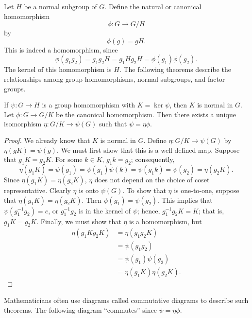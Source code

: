 Let $H$ be a normal subgroup of $G$. Define the {\bfi
natural\/} or {\bfi canonical
homomorphism}  
\[
\phi : G \rightarrow G/H
\]
by
\[
\phi(g) = gH.
\]
This is indeed a homomorphism, since
\[
\phi( g_1 g_2 ) = g_1 g_2 H =  g_1 H g_2 H = \phi( g_1) \phi( g_2 ). 
\]
The kernel of this homomorphism is $H$.	 The following theorems 
describe the relationships among group homomorphisms, normal 
subgroups, and factor groups. 
 
 
\begin{theorem}\label{FirstIsoTheorem}
If $\psi : G \rightarrow H$ is a group homomorphism with $K =\ker
\psi$, then $K$ is normal in $G$. Let $\phi: G \rightarrow G/K$ be
the canonical homomorphism.  Then there exists a unique isomorphism
$\eta: G/K \rightarrow \psi(G)$ such that $\psi =  \eta \phi$.
\end{theorem}
 

 
\begin{proof}
We already know that $K$ is normal in $G$. Define $\eta: G/K
\rightarrow \psi(G)$ by $\eta(gK) = \psi(g)$.  We must first show that
this is a well-defined map. Suppose that $g_1 K =g_2 K$. For some $k \in
K$, $g_1 k=g_2$; consequently, 
\[
\eta(g_1 K) = \psi(g_1) = \psi(g_1) \psi(k) = \psi(g_1k) = \psi(g_2)
= \eta(g_2 K). 
\]
Since $\eta(g_1 K) = \eta(g_2 K)$, $\eta$ does not depend on the 
choice of coset representative. Clearly $\eta$ is onto $\psi( G)$. 
To show that $\eta$ is one-to-one, suppose that $\eta(g_1 K) = 
\eta(g_2 K)$. Then $\psi(g_1) = \psi(g_2)$. This implies that 
$\psi( g_1^{-1} g_2 ) = e$, or $g_1^{-1} g_2$ is in the kernel of $\psi$; 
hence, $g_1^{-1} g_2K = K$; that is, $g_1K =g_2K$.  Finally, we must 
show that $\eta$ is a homomorphism, but 
\begin{align*}
\eta( g_1K g_2K ) & = \eta(g_1 g_2K) \\
& = \psi(g_1 g_2) \\
& = \psi(g_1) \psi(g_2) \\
& = \eta( g_1K) \eta( g_2K ).
\end{align*}
\end{proof}
 
 
\medskip
 
 
Mathematicians often use diagrams called {\bfi commutative
diagrams\/} to describe such theorems. The
following diagram ``commutes'' since $\psi = \eta \phi$. 



